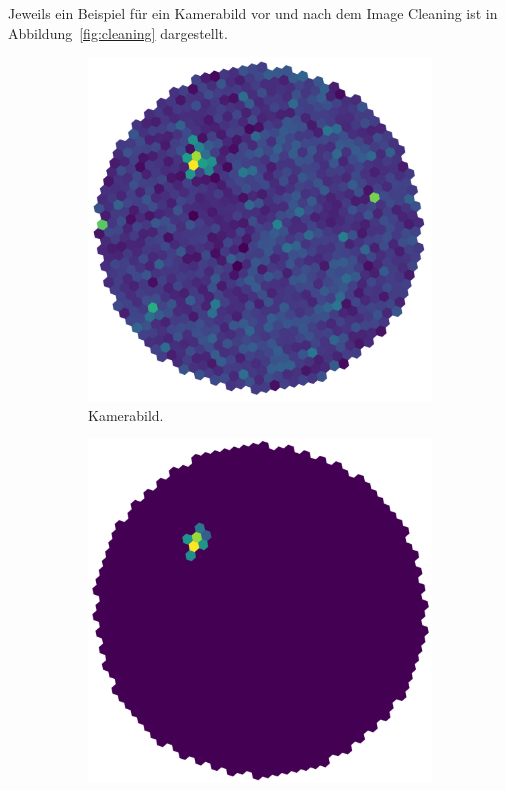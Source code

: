 Jeweils ein Beispiel für ein Kamerabild vor und nach dem Image Cleaning ist in
Abbildung~\ref{fig:cleaning} dargestellt.

\begin{figure}[ht]
  \centering
  \begin{subfigure}[c]{0.35\linewidth}
    \includegraphics[width=\linewidth]{pictures/uncleaned.png}
    \caption{Kamerabild.}%
    \label{fig:uncleaned}
  \end{subfigure}
	\hspace{1cm}
  \begin{subfigure}[c]{0.35\linewidth}
    \includegraphics[width=\linewidth]{pictures/cleaned.png}

\end{subfigure}
\end{figure}
